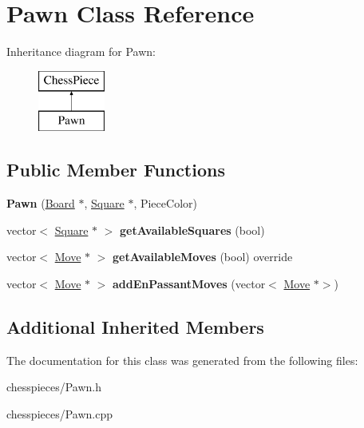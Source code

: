 \hypertarget{class_pawn}{}\section{Pawn Class Reference}
\label{class_pawn}
Inheritance diagram for Pawn\+:\begin{figure}[H]
\begin{center}
\leavevmode
\includegraphics[height=2.000000cm]{class_pawn}
\end{center}
\end{figure}
\subsection*{Public Member Functions}
\begin{DoxyCompactItemize}
\item 
\mbox{\label{class_pawn_a916ab319cd46b42afa364dd1f05895bf}} 
{\bfseries Pawn} (\mbox{\hyperlink{class_board}{Board}} $\ast$, \mbox{\hyperlink{class_square}{Square}} $\ast$, Piece\+Color)
\item 
\mbox{\label{class_pawn_a11d2b85c7aa36107a2025aa3bf0a9fbb}} 
vector$<$ \mbox{\hyperlink{class_square}{Square}} $\ast$ $>$ {\bfseries get\+Available\+Squares} (bool)
\item 
\mbox{\label{class_pawn_a16066f4c1d424d7843af4cb4ffc01594}} 
vector$<$ \mbox{\hyperlink{class_move}{Move}} $\ast$ $>$ {\bfseries get\+Available\+Moves} (bool) override
\item 
\mbox{\label{class_pawn_a62f439391ed8f3b37d191248f80ae022}} 
vector$<$ \mbox{\hyperlink{class_move}{Move}} $\ast$ $>$ {\bfseries add\+En\+Passant\+Moves} (vector$<$ \mbox{\hyperlink{class_move}{Move}} $\ast$$>$)
\end{DoxyCompactItemize}
\subsection*{Additional Inherited Members}


The documentation for this class was generated from the following files\+:\begin{DoxyCompactItemize}
\item 
chesspieces/Pawn.\+h\item 
chesspieces/Pawn.\+cpp\end{DoxyCompactItemize}

